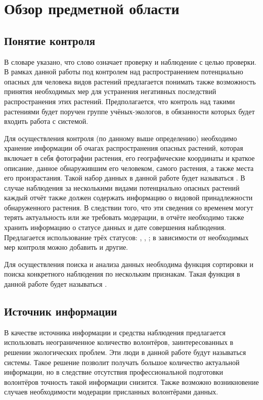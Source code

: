 \section{Обзор предметной области}

\subsection{Понятие контроля}

\tab
В словаре\cite{control} указано, что слово  означает проверку и наблюдение с целью проверки.
В рамках данной работы под контролем над распространением потенциально опасных для человека видов растений предлагается понимать также возможность принятия необходимых мер для устранения негативных последствий распространения этих растений.
Предполагается, что контроль над такими растениями будет поручен группе учёных-экологов, в обязанности которых будет входить работа с системой.

\nwln
Для осуществления контроля (по данному выше определению) необходимо хранение информации об очагах распространения опасных растений, которая включает в себя фотографии растения, его географические координаты и краткое описание, данное обнаружившим его человеком, самого растения, а также места его произрастания.
Такой набор данных в данной работе будет называться .
В случае наблюдения за несколькими видами потенциально опасных растений каждый отчёт также должен содержать информацию о видовой принадлежности обнаруженного растения.
В следствии того, что эти сведения со временем могут терять актуальность или же требовать модерации, в отчёте необходимо также хранить информацию о статусе данных и дате совершения наблюдения.
Предлагается использование трёх статусов: , , ; в зависимости от необходимых мер контроля можно добавить и другие.

\nwln
Для осуществления поиска и анализа данных необходима функция сортировки и поиска конкретного наблюдения по нескольким признакам. Такая функция в данной работе будет называться . \\

\subsection{Источник информации}

\tab
В качестве источника информации и средства наблюдения предлагается использовать неограниченное количество волонтёров, заинтересованных в решении экологических проблем.
Эти люди в данной работе будут называться  системы.
Такое решение позволит получать большое количество актуальной информации, но в следствие отсутствия профессиональной подготовки волонтёров точность такой информации снизится.
Также возможно возникновение случаев необходимости модерации присланных волонтёрами данных.

